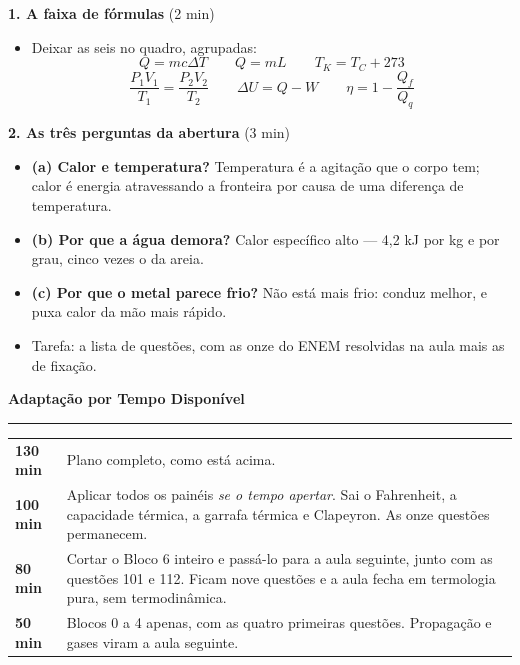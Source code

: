 \documentclass[11pt,a4paper]{article}
\newcommand{\secao}[1]{%
  \needspace{6\baselineskip}
  \vspace{1.8em}
  {\Large\bfseries #1}\\[-0.55em]
  {\color{black!30}\rule{\linewidth}{0.5pt}}
  \par\nobreak\smallskip
}
\begin{document}
\begin{quadro}
\textbf{1. A faixa de f\'ormulas} (2 min)
\begin{itemize}[nosep]
  \item Deixar as seis no quadro, agrupadas:
  \[
    Q = mc\Delta T \qquad Q = mL \qquad T_K = T_C + 273
  \]
  \[
    \frac{P_1V_1}{T_1} = \frac{P_2V_2}{T_2} \qquad
    \Delta U = Q - W \qquad
    \eta = 1 - \frac{Q_f}{Q_q}
  \]
\end{itemize}

\medskip
\textbf{2. As tr\^es perguntas da abertura} (3 min)
\begin{itemize}[nosep]
  \item \textbf{(a) Calor e temperatura?} Temperatura \'e a agita\c{c}\~ao que o
        corpo tem; calor \'e energia atravessando a fronteira por causa de
        uma diferen\c{c}a de temperatura.
  \item \textbf{(b) Por que a \'agua demora?} Calor espec\'ifico alto ---
        4,2 kJ por kg e por grau, cinco vezes o da areia.
  \item \textbf{(c) Por que o metal parece frio?} N\~ao est\'a mais frio:
        conduz melhor, e puxa calor da m\~ao mais r\'apido.
  \item Tarefa: a lista de quest\~oes, com as onze do ENEM resolvidas na
        aula mais as de fixa\c{c}\~ao.
\end{itemize}
\end{quadro}

\secao{Adapta\c{c}\~ao por Tempo Dispon\'ivel}

{\renewcommand{\arraystretch}{1.35}
\begin{tabularx}{\linewidth}{@{}p{2.2cm}X@{}}
  \toprule
  \textbf{130 min} & Plano completo, como est\'a acima. \\
  \addlinespace[2pt]
  \textbf{100 min} & Aplicar todos os pain\'eis
    \textit{se o tempo apertar}. Sai o Fahrenheit, a capacidade t\'ermica,
    a garrafa t\'ermica e Clapeyron. As onze quest\~oes permanecem. \\
  \addlinespace[2pt]
  \textbf{80 min} & Cortar o Bloco 6 inteiro e pass\'a-lo para a aula
    seguinte, junto com as quest\~oes 101 e 112. Ficam nove quest\~oes e a
    aula fecha em termologia pura, sem termodin\^amica. \\
  \addlinespace[2pt]
  \textbf{50 min} & Blocos 0 a 4 apenas, com as quatro primeiras
    quest\~oes. Propaga\c{c}\~ao e gases viram a aula seguinte. \\
  \bottomrule
\end{tabularx}}
\end{document}
